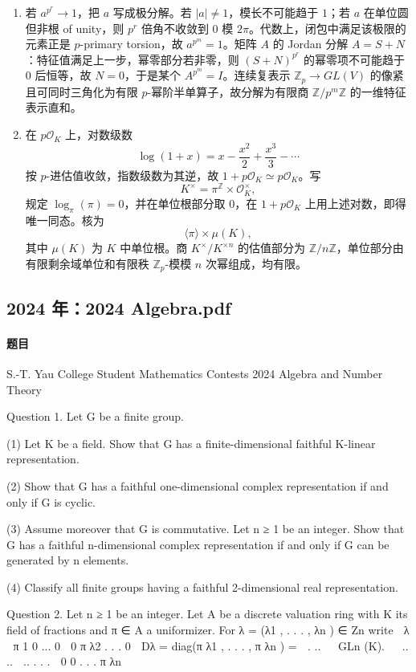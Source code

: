 \documentclass[UTF8,12pt]{ctexart}
\begin{document}
\begin{enumerate}[label=\textbf{\arabic*.},leftmargin=2.2em]
\item 若 \(a^{p^r}\to1\)，把 \(a\) 写成极分解。若 \(|a|\ne1\)，模长不可能趋于 \(1\)；若 \(a\) 在单位圆但非根 of unity，则 \(p^r\) 倍角不收敛到 \(0\) 模 \(2\pi\)。代数上，闭包中满足该极限的元素正是 \(p\)-primary torsion，故 \(a^{p^m}=1\)。矩阵 \(A\) 的 Jordan 分解 \(A=S+N\)：特征值满足上一步，幂零部分若非零，则 \((S+N)^{p^r}\) 的幂零项不可能趋于 \(0\) 后恒等，故 \(N=0\)，于是某个 \(A^{p^m}=I\)。连续复表示 \(\mathbb Z_p\to GL(V)\) 的像紧且可同时三角化为有限 \(p\)-幂阶半单算子，故分解为有限商 \(\mathbb Z/p^m\mathbb Z\) 的一维特征表示直和。
\item 在 \(p\mathcal O_K\) 上，对数级数
\[
\log(1+x)=x-\frac{x^2}{2}+\frac{x^3}{3}-\cdots
\]
按 \(p\)-进估值收敛，指数级数为其逆，故 \(1+p\mathcal O_K\simeq p\mathcal O_K\)。写
\[
K^\times=\pi^{\mathbb Z}\times \mathcal O_K^\times,
\]
规定 \(\log_\pi(\pi)=0\)，并在单位根部分取 \(0\)，在 \(1+p\mathcal O_K\) 上用上述对数，即得唯一同态。核为
\[
\langle \pi\rangle\times \mu(K),
\]
其中 \(\mu(K)\) 为 \(K\) 中单位根。商 \(K^\times/K^{\times n}\) 的估值部分为 \(\mathbb Z/n\mathbb Z\)，单位部分由有限剩余域单位和有限秩 \(\mathbb Z_p\)-模模 \(n\) 次幂组成，均有限。
\end{enumerate}

\subsection{2024 年：2024 Algebra.pdf}
\paragraph{题目}
S.-T. Yau College Student Mathematics Contests 2024 Algebra and Number Theory

Question 1. Let G be a finite group.

(1) Let K be a field. Show that G has a finite-dimensional faithful K-linear representation.

(2) Show that G has a faithful one-dimensional complex representation if and only if G is cyclic.

(3) Assume moreover that G is commutative. Let n ≥ 1 be an integer. Show that G has a faithful n-dimensional complex representation if and only if G can be generated by n elements.

(4) Classify all finite groups having a faithful 2-dimensional real representation.

Question 2. Let n ≥ 1 be an integer. Let A be a discrete valuation ring with K its field of fractions and π ∈ A a uniformizer. For λ = (λ1 , . . . , λn ) ∈ Zn write  λ  π 1 0 ... 0  0 π λ2 . . . 0  Dλ = diag(π λ1 , . . . , π λn ) =  . ..  ∈ GLn (K).   .. ..  .. . . .  0 0 . . . π λn
\end{document}

